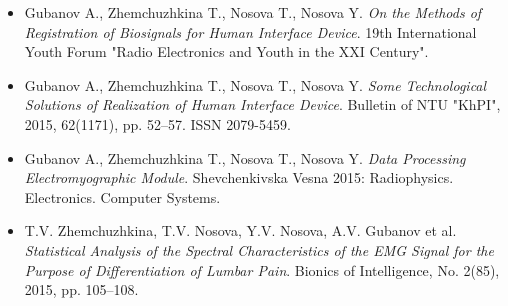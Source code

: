 \begin{itemize}[leftmargin=*]
  \item Gubanov A., Zhemchuzhkina T., Nosova T., Nosova Y.\newline
  \textit{On the Methods of Registration of Biosignals for Human Interface Device}.\newline
  19th International Youth Forum "Radio Electronics and Youth in the XXI Century".

  \item Gubanov A., Zhemchuzhkina T., Nosova T., Nosova Y.\newline
  \textit{Some Technological Solutions of Realization of Human Interface Device}.\newline
  Bulletin of NTU "KhPI", 2015, 62(1171), pp. 52--57. ISSN 2079-5459.

  \item Gubanov A., Zhemchuzhkina T., Nosova T., Nosova Y.\newline
  \textit{Data Processing Electromyographic Module}.\newline
  Shevchenkivska Vesna 2015: Radiophysics. Electronics. Computer Systems.

  \item T.V. Zhemchuzhkina, T.V. Nosova, Y.V. Nosova, A.V. Gubanov et al.\newline
  \textit{Statistical Analysis of the Spectral Characteristics of the EMG Signal for the Purpose of Differentiation of Lumbar Pain}.\newline
  Bionics of Intelligence, No. 2(85), 2015, pp. 105--108.
\end{itemize}
